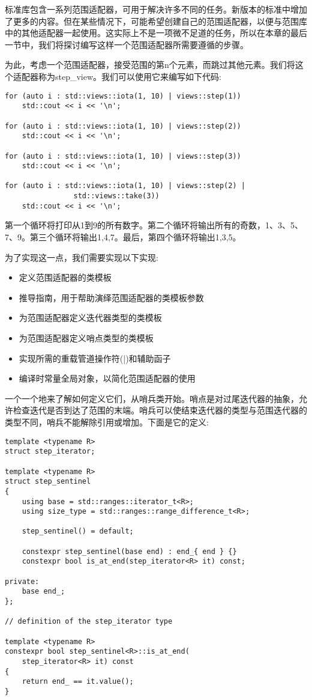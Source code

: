 标准库包含一系列范围适配器，可用于解决许多不同的任务。新版本的标准中增加了更多的内容。但在某些情况下，可能希望创建自己的范围适配器，以便与范围库中的其他适配器一起使用。这实际上不是一项微不足道的任务，所以在本章的最后一节中，我们将探讨编写这样一个范围适配器所需要遵循的步骤。

为此，考虑一个范围适配器，接受范围的第n个元素，而跳过其他元素。我们将这个适配器称为step\_view。我们可以使用它来编写如下代码:

\begin{lstlisting}[style=styleCXX]
for (auto i : std::views::iota(1, 10) | views::step(1))
	std::cout << i << '\n';

for (auto i : std::views::iota(1, 10) | views::step(2))
	std::cout << i << '\n';

for (auto i : std::views::iota(1, 10) | views::step(3))
	std::cout << i << '\n';

for (auto i : std::views::iota(1, 10) | views::step(2) | 	
				std::views::take(3))
	std::cout << i << '\n';
\end{lstlisting}

第一个循环将打印从1到9的所有数字。第二个循环将输出所有的奇数，1、3、5、7、9。第三个循环将输出1,4,7。最后，第四个循环将输出1,3,5。

为了实现这一点，我们需要实现以下实现:

\begin{itemize}
\item
定义范围适配器的类模板

\item
推导指南，用于帮助演绎范围适配器的类模板参数

\item
为范围适配器定义迭代器类型的类模板

\item
为范围适配器定义哨点类型的类模板

\item
实现所需的重载管道操作符(|)和辅助函子

\item
编译时常量全局对象，以简化范围适配器的使用
\end{itemize}

一个一个地来了解如何定义它们，从哨兵类开始。哨点是对过尾迭代器的抽象，允许检查迭代是否到达了范围的末端。哨兵可以使结束迭代器的类型与范围迭代器的类型不同，哨兵不能解除引用或增加。下面是它的定义:

\begin{lstlisting}[style=styleCXX]
template <typename R>
struct step_iterator;

template <typename R>
struct step_sentinel
{
	using base = std::ranges::iterator_t<R>;
	using size_type = std::ranges::range_difference_t<R>;
	
	step_sentinel() = default;
	
	constexpr step_sentinel(base end) : end_{ end } {}
	constexpr bool is_at_end(step_iterator<R> it) const;
	
private:
	base end_;
};

// definition of the step_iterator type

template <typename R>
constexpr bool step_sentinel<R>::is_at_end(
	step_iterator<R> it) const
{
	return end_ == it.value();
}
\end{lstlisting}

